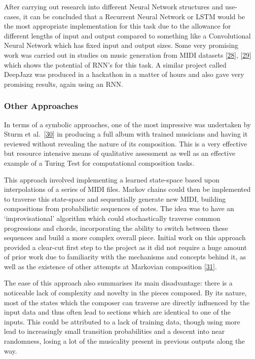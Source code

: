 \documentclass[12pt,]{article}
\begin{document}
After carrying out research into different Neural Network structures and
use-cases, it can be concluded that a Recurrent Neural Network or LSTM
would be the most appropriate implementation for this task due to the
allowance for different lengths of input and output compared to
something like a Convolutional Neural Network which has fixed input and
output sizes. Some very promising work was carried out in studies on
music generation from MIDI datasets
{[}\protect\hyperlink{ref-hilschermusic}{28}{]},
{[}\protect\hyperlink{ref-wyse2018real}{29}{]} which shows the potential
of RNN's for this task. A similar project called DeepJazz was produced
in a hackathon in a matter of hours and also gave very promising
results, again using an RNN.

\hypertarget{other-approaches}{%
\subsubsection{Other Approaches}\label{other-approaches}}

In terms of a symbolic approaches, one of the most impressive was
undertaken by Sturm et
al.~{[}\protect\hyperlink{ref-sturm2018let}{30}{]} in producing a full
album with trained musicians and having it reviewed without revealing
the nature of its composition. This is a very effective but resource
intensive means of qualitative assessment as well as an effective
example of a Turing Test for computational composition tasks.

This approach involved implementing a learned state-space based upon
interpolations of a series of MIDI files. Markov chains could then be
implemented to traverse this state-space and sequentially generate new
MIDI, building compositions from probabilistic sequences of notes. The
idea was to have an `improvisational' algorithm which could
stochastically traverse common progressions and chords, incorporating
the ability to switch between these sequences and build a more complex
overall piece. Initial work on this approach provided a clear-cut first
step to the project as it did not require a huge amount of prior work
due to familiarity with the mechanisms and concepts behind it, as well
as the existence of other attempts at Markovian composition
{[}\protect\hyperlink{ref-markovcomposer}{31}{]}.

The ease of this approach also summarises its main disadvantage: there
is a noticeable lack of complexity and novelty in the pieces composed.
By its nature, most of the states which the composer can traverse are
directly influenced by the input data and thus often lead to sections
which are identical to one of the inputs. This could be attributed to a
lack of training data, though using more lead to increasingly small
transition probabilities and a descent into near randomness, losing a
lot of the musicality present in previous outputs along the way.
\end{document}
